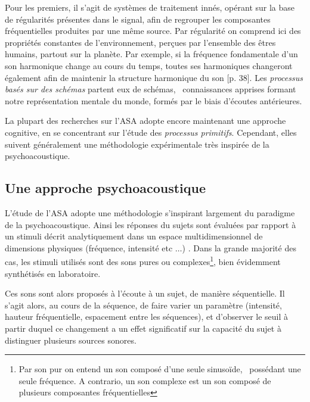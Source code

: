 Pour les premiers, il s'agit de systèmes de traitement innés, opérant sur la base de régularités présentes dans le signal, afin de regrouper les composantes fréquentielles produites par une même source. Par régularité on comprend ici des propriétés constantes de l'environnement, perçues par l'ensemble des êtres humains, partout sur la planète. Par exemple, si la fréquence fondamentale d'un son harmonique change au cours du temps, toutes ses harmoniques changeront également afin de maintenir la structure harmonique du son [p. 38]\citep{bregman1994auditory}. Les \emph{processus basés sur des schémas}  partent eux de schémas, \ie~connaissances apprises formant notre représentation mentale du monde, formés par le biais d'écoutes antérieures. 

La plupart des recherches sur l'ASA adopte encore maintenant une approche cognitive, en se concentrant sur l'étude des \emph{processus primitifs}. Cependant, elles suivent généralement une méthodologie expérimentale très inspirée de la psychoacoustique.

\subsection{Une approche psychoacoustique}

L'étude de l'ASA adopte une méthodologie s'inspirant largement du paradigme de la psychoacoustique. Ainsi les réponses du sujets sont évaluées par rapport à un stimuli décrit analytiquement dans un espace multidimensionnel de dimensions physiques (fréquence, intensité etc $\ldots$) \citep{dubois2006cognitive}. Dans la grande majorité des cas, les stimuli utilisés sont des sons pures ou complexes\footnote{Par son pur on entend un son composé d'une seule sinusoïde, \ie~possédant une seule fréquence. A contrario, un son complexe est un son composé de plusieurs composantes fréquentielles}, bien évidemment synthétisés en laboratoire. 

Ces sons sont alors proposés à l'écoute à un sujet, de manière séquentielle. Il s'agit alors, au cours de la séquence, de faire varier un paramètre (intensité, hauteur fréquentielle, espacement entre les séquences), et d'observer le seuil à partir duquel ce changement a un effet significatif sur la capacité du sujet à distinguer plusieurs sources sonores.

